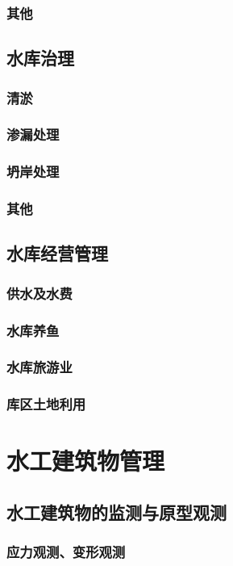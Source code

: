\documentclass[UTF8]{../../ApplicationUniverse}
\begin{document}
        \subsubsection{其他}
    \subsection{水库治理}
        \subsubsection{清淤}
        \subsubsection{渗漏处理}
        \subsubsection{坍岸处理}
        \subsubsection{其他}
    \subsection{水库经营管理}
        \subsubsection{供水及水费}
        \subsubsection{水库养鱼}
        \subsubsection{水库旅游业}
        \subsubsection{库区土地利用}
\section{水工建筑物管理}
    \subsection{水工建筑物的监测与原型观测}
        \subsubsection{应力观测、变形观测}
\end{document}
